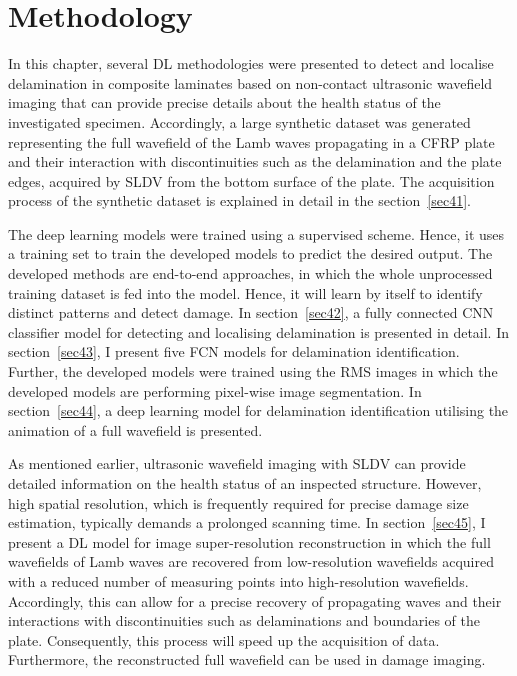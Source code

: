 \chapter[Methodology]{Methodology}
\label{ch4}

In this chapter, several DL methodologies were presented to detect and localise delamin\-ation in composite laminates based on non-contact ultrasonic wavefield imaging that can provide precise details about the health status of the investigated specimen.
Accordingly, a large synthetic dataset was generated representing the full wavefield of the Lamb waves propagating in a CFRP plate and their interaction with discontinuities such as the delamination and the plate edges, acquired by SLDV from the bottom surface of the plate.
The acquisition process of the synthetic dataset is explained in detail in the section~\ref{sec41}.

The deep learning models were trained using a supervised scheme. 
Hence, it uses a training set to train the developed models to predict the desired output.
The developed methods are end-to-end approaches, in which the whole unprocessed training dataset is fed into the model.
Hence, it will learn by itself to identify distinct patterns and detect damage.
In section~\ref{sec42}, a fully connected CNN classifier model for detecting and localising delamination is presented in detail.
In section~\ref{sec43}, I present five FCN models for delamination identification. 
Further, the developed models were trained using the RMS images in which the developed models are performing pixel-wise image segmentation.
In section~\ref{sec44}, a deep learning model for delamination identification utilising the animation of a full wavefield is presented.

As mentioned earlier, ultrasonic wavefield imaging with SLDV can provide detailed information on the health status of an inspected structure.
However, high spatial resolution, which is frequently required for precise damage size estimation, typically demands a prolonged scanning time.
In section~\ref{sec45}, I present a DL model for image super-resolution reconstruction in which the full wavefields of Lamb waves are recovered from low-resolution wavefields acquired with a reduced number of measuring points into high-resolution wavefields.
Accordingly, this can allow for a precise recovery of propagating waves and their interactions with discontinuities such as delaminations and boundaries of the plate.
Consequently, this process will speed up the acquisition of data.
Furthermore, the reconstructed full wavefield can be used in damage imaging. 

